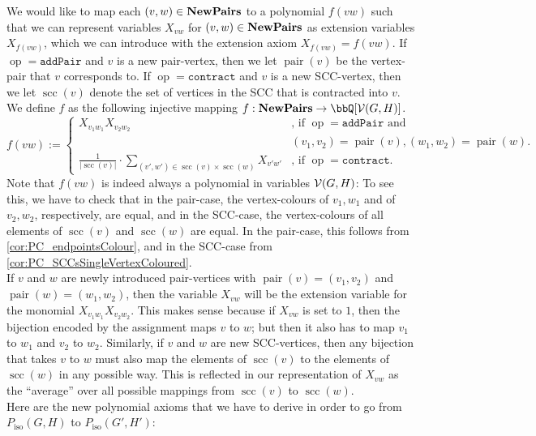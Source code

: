\documentclass[10pt,a4paper]{article}
\newcommand{\Pairs}{\text{\upshape \textbf{NewPairs}}}
\newcommand{\Vv}{{\cal V}}
\newcommand{\pairOp }{\texttt{addPair}}
\newcommand{\sccOp }{\texttt{contract}}
\newcommand{\op}{\operatorname{op}}
\newcommand{\scc}{{\operatorname{scc}}}
\newcommand{\pair}{{\operatorname{pair}}}
\newcommand{\Piso}{P_{\text{iso}}}
\begin{document}
	We would like to map each $(v,w) \in \Pairs$ to a polynomial $f(vw)$ such that we can represent variables $X_{vw}$ for $(v,w) \in \Pairs$ as extension variables $X_{f(vw)}$, which we can introduce with the extension axiom $X_{f(vw)} = f(vw)$. If $\op = \pairOp$ and $v$ is a new pair-vertex, then we let $\pair(v)$ be the vertex-pair that $v$ corresponds to. If $\op = \sccOp$ and $v$ is a new SCC-vertex, then we let $\scc(v)$ denote the set of vertices in the SCC that is contracted into $v$. We define $f$ as the following injective mapping $f : \Pairs \to \bbQ[\Vv(G,H)]$. 
	\begin{equation*}
		f(vw) := \begin{cases}
			X_{v_1w_1}X_{v_2w_2} & \text{, if } \op = \pairOp \text{ and }\\  & (v_1,v_2) = \pair(v), (w_1,w_2) = \pair(w). \\
			\frac{1}{|\scc(v)|} \cdot  \sum\limits_{(v',w')\in \scc(v) \times \scc(w)} X_{v'w'}& \text{, if } \op=\sccOp.
		\end{cases}
	\end{equation*} 
	Note that $f(vw)$ is indeed always a polynomial in variables $\Vv(G,H)$: To see this, we have to check that in the pair-case, the vertex-colours of $v_1,w_1$ and of $v_2, w_2$, respectively, are equal, and in the SCC-case, the vertex-colours of all elements of $\scc(v)$ and $\scc(w)$ are equal. In the pair-case, this follows from \autoref{cor:PC_endpointsColour}, and in the SCC-case from \autoref{cor:PC_SCCsSingleVertexColoured}.\\
	
	If $v$ and $w$ are newly introduced pair-vertices with $\pair(v) = (v_1,v_2)$ and $\pair(w) = (w_1,w_2)$, then the variable $X_{vw}$ will be the extension variable for the monomial $X_{v_1w_1}X_{v_2w_2}$. This makes sense because if $X_{vw}$ is set to $1$, then the bijection encoded by the assignment maps $v$ to $w$; but then it also has to map $v_1$ to $w_1$ and $v_2$ to $w_2$. Similarly, if $v$ and $w$ are new SCC-vertices, then any bijection that takes $v$ to $w$ must also map the elements of $\scc(v)$ to the elements of $\scc(w)$ in any possible way. This is reflected in our representation of $X_{vw}$ as the ``average'' over all possible mappings from $\scc(v)$ to $\scc(w)$.\\
	
	Here are the new polynomial axioms that we have to derive in order to go from $\Piso(G,H)$ to $\Piso(G',H')$:
	
\end{document}
